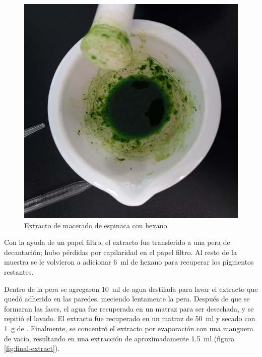 \documentclass{ITESO-Reporte}
\begin{document}
\begin{figure}[htpb]
    \centering
    \includegraphics[width=0.9\columnwidth]{figuras/extract.jpg}
    \caption{Extracto de macerado de espinaca con hexano.}
    \label{fig:extract}
\end{figure}

Con la ayuda de un papel filtro, el extracto fue transferido a una pera de decantación; hubo pérdidas por capilaridad en el papel filtro. Al resto de la muestra se le volvieron a adicionar \qty{6}{\ml} de hexano para recuperar los pigmentos restantes.

Dentro de la pera se agregaron \qty{10}{\ml} de agua destilada para lavar el extracto que quedó adherido en las paredes, meciendo lentamente la pera. Después de que se formaran las fases, el agua fue recuperada en un matraz para ser desechada, y se repitió el lavado. El extracto fue recuperado en un matraz de \qty{50}{\ml} y secado con \qty{1}{\g} de . Finalmente, se concentró el extracto por evaporación con una manguera de vacío, resultando en una extracción de aproximadamente \qty{1.5}{\ml} (figura \ref{fig:final-extract}).
\end{document}
